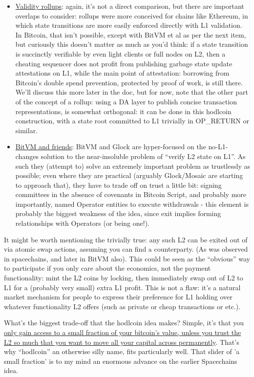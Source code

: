 \documentclass[11pt,a4paper]{article}
\begin{document}
\begin{itemize}
\item \underline{Validity rollups}: again, it's not a direct comparison, but there are important overlaps to consider: rollups were more conceived for chains like Ethereum, in which state transitions are more easily enforced directly with L1 validation. In Bitcoin, that isn't possible, except with BitVM et al as per the next item, but curiously this doesn't matter as much as you'd think: if a state transition is succinctly verifiable by even light clients or full nodes on L2, then a cheating sequencer does not profit from publishing garbage state update attestations on L1, while the main point of attestation: borrowing from Bitcoin's double spend prevention, protected by proof of work, is still there. We'll discuss this more later in the doc, but for now, note that the other part of the concept of a rollup: using a DA layer to publish concise transaction representations, is somewhat orthogonal: it can be done in this hodlcoin construction, with a state root committed to L1 trivially in OP\_RETURN or similar.
\item \underline{BitVM and friends}: BitVM and Glock are hyper-focused on the no-L1-changes solution to the near-insoluble problem of ``verify L2 state on L1''. As such they (attempt to) solve an extremely important problem as trustlessly as possible; even where they are practical (arguably Glock/Mosaic are starting to approach that), they have to trade off on trust a little bit: signing committees in the absence of covenants in Bitcoin Script, and probably more importantly, named Operator entities to execute withdrawals - this element is probably the biggest weakness of the idea, since exit implies forming relationships with Operators (or being one!).

\end{itemize}

It might be worth mentioning the trivially true: any such L2 can be exited out of via atomic swap actions, assuming you can find a counterparty. (As was observed in spacechains, and later in BitVM also). This could be seen as the ``obvious'' way to participate if you only care about the economics, not the payment functionality: mint the L2 coins by locking, then immediately swap out of L2 to L1 for a (probably very small) extra L1 profit. This is not a flaw: it's a natural market mechanism for people to express their preference for L1 holding over whatever functionality L2 offers (such as private or cheap transactions or etc.).

What's the biggest trade-off that the hodlcoin idea makes? Simple, it's that you \uline{only gain access to a small fraction of your bitcoin's value, unless you trust the L2 so much that you want to move all your capital across permanently}. That's why ``hodlcoin'' an otherwise silly name, fits particularly well. That slider of 'a small fraction' is to my mind an enormous advance on the earlier Spacechains idea.
\end{document}
